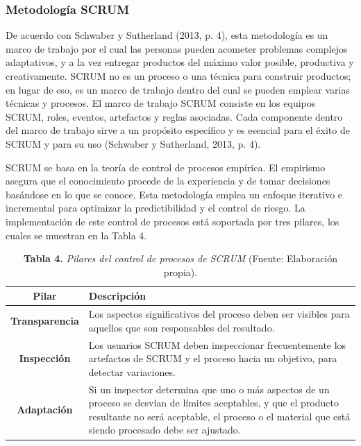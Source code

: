 \documentclass[12pt, a4paper]{article}
\begin{document}
	\subsubsection{Metodolog\'{i}a SCRUM}
	
De acuerdo con Schwaber y Sutherland (2013, p. 4), esta metodolog\'{i}a es un marco de trabajo por el cual las personas pueden acometer problemas complejos adaptativos, y a la vez entregar productos del m\'{a}ximo valor posible, productiva y creativamente. SCRUM no es un proceso o una t\'{e}cnica para construir productos; en lugar de eso, es un marco de trabajo dentro del cual se pueden emplear varias t\'{e}cnicas y procesos. 
El marco de trabajo SCRUM consiste en los equipos SCRUM, roles, eventos, artefactos y reglas asociadas. Cada componente dentro del marco de trabajo sirve a un prop\'{o}sito espec\'{i}fico y es esencial para el \'{e}xito de SCRUM y para su uso (Schwaber y Sutherland, 2013, p. 4).

SCRUM se basa en la teor\'{i}a de control de procesos emp\'{i}rica. El empirismo asegura 	que el conocimiento procede de la experiencia y de tomar decisiones bas\'{a}ndose en lo que se conoce. Esta metodolog\'{i}a emplea un enfoque iterativo e incremental para optimizar la predictibilidad y el control de riesgo. La implementaci\'{o}n de este control de procesos est\'{a} soportada por tres pilares, los cuales se muestran en la Tabla 4.

\begin{table}[htb]
	\small
	\centering
	\setlength{\extrarowheight}{5pt}
	\begin{tabulary}{15cm}{|c|L|}
		\hline
		\textbf{Pilar} & \textbf{Descripci\'{o}n}\\ \hline
		\textbf{Transparencia} & Los aspectos significativos del proceso deben ser visibles para aquellos que son responsables del resultado.\\ \hline
		\textbf{Inspecci\'{o}n} & Los usuarios SCRUM deben inspeccionar frecuentemente los artefactos de SCRUM y el proceso hacia un objetivo, para detectar variaciones.\\ \hline
		\textbf{Adaptaci\'{o}n} & Si un inspector determina que uno o m\'{a}s aspectos de un proceso se desv\'{i}an de l\'{i}mites aceptables, y que el producto resultante no ser\'{a} aceptable, el proceso o el material que est\'{a} siendo procesado debe ser ajustado.\\ \hline
	\end{tabulary}
	\caption{\textbf{Tabla 4.} \textit{Pilares del control de procesos de SCRUM} (Fuente: Elaboraci\'{o}n propia).}
\end{table}
\end{document}
